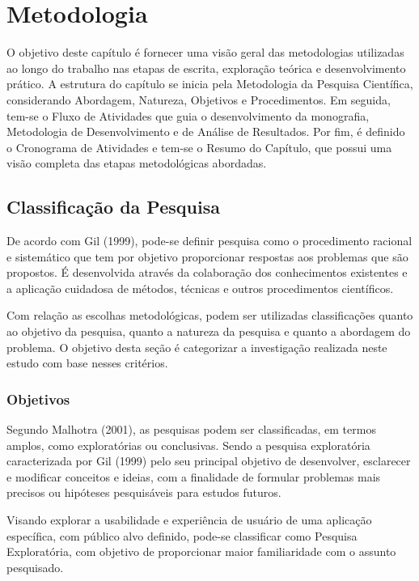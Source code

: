 \chapter[Metodologia]{Metodologia}
\label{chap:Metodologia}

O objetivo deste capítulo é fornecer uma visão geral das metodologias utilizadas ao longo do trabalho nas etapas de escrita, exploração teórica e desenvolvimento prático. 
A estrutura do capítulo se inicia pela Metodologia da Pesquisa Científica, considerando Abordagem, Natureza, Objetivos e Procedimentos. Em seguida, tem-se o Fluxo de Atividades que guia o desenvolvimento  
da monografia, Metodologia de Desenvolvimento e de Análise de Resultados. Por fim, é definido o Cronograma de Atividades e tem-se o Resumo do Capítulo, que possui uma visão completa das etapas 
metodológicas abordadas.

\section{Classificação da Pesquisa}
\label{sec:Classificação da Pesquisa}
De acordo com Gil (1999), pode-se definir pesquisa como o procedimento racional e sistemático que tem por objetivo proporcionar respostas aos problemas que são propostos. É desenvolvida através da colaboração 
dos conhecimentos existentes e a aplicação cuidadosa de métodos, técnicas e outros procedimentos científicos.

Com relação as escolhas metodológicas, podem ser utilizadas classificações quanto ao objetivo da pesquisa, quanto a natureza da pesquisa e quanto a abordagem do problema. O objetivo desta seção é 
categorizar a investigação realizada neste estudo com base nesses critérios.

\subsection{Objetivos}
\label{sec:Objetivos2}
Segundo Malhotra (2001), as pesquisas podem ser classificadas, em termos amplos, como exploratórias ou conclusivas. Sendo a pesquisa exploratória caracterizada por Gil (1999) pelo seu principal objetivo de 
desenvolver, esclarecer e modificar conceitos e ideias, com a finalidade de formular problemas mais precisos ou hipóteses pesquisáveis para estudos futuros.

Visando explorar a usabilidade e experiência de usuário de uma aplicação específica, com público alvo definido, pode-se classificar como Pesquisa Exploratória, com objetivo de proporcionar maior familiaridade 
com o assunto pesquisado.

